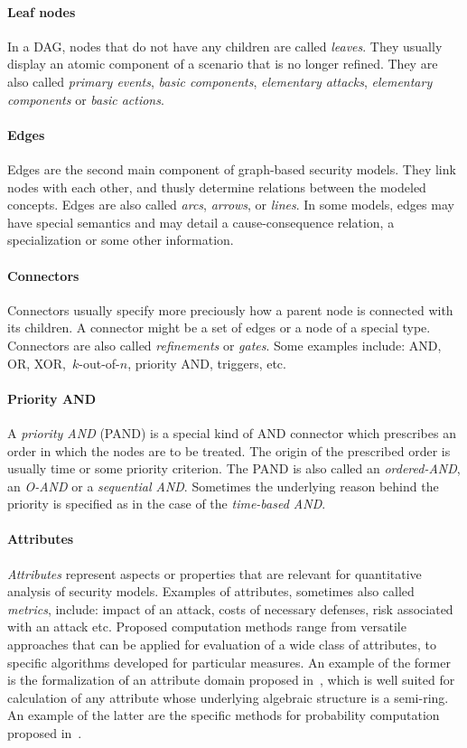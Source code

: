 \documentclass[a4paper]{article}
\begin{document}
\paragraph{Leaf nodes}
In a DAG, nodes that do not have any children are called \emph{leaves}. They
usually display an atomic component of a scenario that is no longer refined.
They are also called \emph{primary events}, \emph{basic components},
\emph{elementary attacks}, \emph{elementary components} or \emph{basic actions}.

\paragraph{Edges}
Edges are the second main component of graph-based security models. They link
nodes with each other, and thusly determine relations between the modeled
concepts. Edges are also called \emph{arcs}, \emph{arrows}, or \emph{lines}. In
some models, edges may have special semantics and may detail a cause-consequence
relation, a specialization or some other information.

\paragraph{Connectors}
Connectors usually specify more preciously how a parent node is connected with
its children. A connector might be a set of edges or a node of a special type. 
Connectors are also called \emph{refinements} or \emph{gates}. Some examples 
include: AND, OR, XOR,~$k$-out-of-$n$, priority AND, triggers, etc.

\paragraph{Priority AND}
A \emph{priority AND} (PAND) is a special kind of AND connector which prescribes
an order in which the nodes are to be treated. The origin of the prescribed
order is usually time or some priority criterion. The PAND is also called an
\emph{ordered-AND}, an \emph{O-AND} or a \emph{sequential AND}. Sometimes the
underlying reason behind the priority is specified as in the case of the
\emph{time-based AND}.

\paragraph{Attributes}
\emph{Attributes} represent aspects or properties that are relevant for
quantitative analysis of security models. Examples of attributes, sometimes also
called \emph{metrics}, include: impact of an attack, costs of necessary
defenses, risk associated with an attack etc. Proposed computation methods range
from versatile approaches that can be applied for evaluation of a wide class of
attributes, to specific algorithms developed for particular measures. An 
example of the former is the formalization of an attribute domain proposed 
in~\cite{MaOo}, which is well suited for calculation of any attribute whose 
underlying algebraic structure is a semi-ring. An example of the latter are the 
specific methods for probability computation proposed in~\cite{Yage}.
\end{document}
